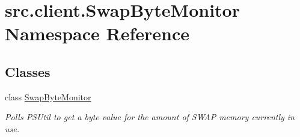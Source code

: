 \hypertarget{namespacesrc_1_1client_1_1_swap_byte_monitor}{\section{src.\-client.\-Swap\-Byte\-Monitor Namespace Reference}
\label{namespacesrc_1_1client_1_1_swap_byte_monitor}
}
\subsection*{Classes}
\begin{DoxyCompactItemize}
\item 
class \hyperlink{classsrc_1_1client_1_1_swap_byte_monitor_1_1_swap_byte_monitor}{Swap\-Byte\-Monitor}
\begin{DoxyCompactList}\small\item\em Polls P\-S\-Util to get a byte value for the amount of S\-W\-A\-P memory currently in use. \end{DoxyCompactList}\end{DoxyCompactItemize}
